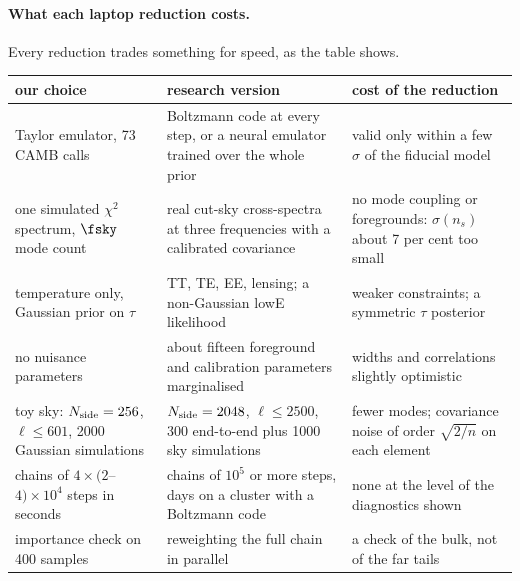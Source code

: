 \paragraph{What each laptop reduction costs.} Every reduction trades something for speed, as the table shows.
\begin{center}
\small
\renewcommand{\arraystretch}{1.15}
\begin{tabularx}{\linewidth}{@{}>{\raggedright\arraybackslash}p{3.3cm}>{\raggedright\arraybackslash}X>{\raggedright\arraybackslash}X@{}}
\toprule
our choice & research version & cost of the reduction\\\midrule
Taylor emulator, 73 CAMB calls & Boltzmann code at every step, or a neural emulator trained over the whole prior & valid only within a few $\sigma$ of the fiducial model\\
one simulated $\chi^2$ spectrum, $\fsky$ mode count & real cut-sky cross-spectra at three frequencies with a calibrated covariance & no mode coupling or foregrounds: $\sigma(n_s)$ about 7 per cent too small\\
temperature only, Gaussian prior on $\tau$ & TT, TE, EE, lensing; a non-Gaussian lowE likelihood & weaker constraints; a symmetric $\tau$ posterior\\
no nuisance parameters & about fifteen foreground and calibration parameters marginalised & widths and correlations slightly optimistic\\
toy sky: $N_{\rm side}=256$, $\ell\le601$, 2000 Gaussian simulations & $N_{\rm side}=2048$, $\ell\le2500$, 300 end-to-end plus 1000 sky simulations & fewer modes; covariance noise of order $\sqrt{2/n}$ on each element\\
chains of $4\times(2$--$4)\times10^4$ steps in seconds & chains of $10^5$ or more steps, days on a cluster with a Boltzmann code & none at the level of the diagnostics shown\\
importance check on 400 samples & reweighting the full chain in parallel & a check of the bulk, not of the far tails\\
\bottomrule
\end{tabularx}
\end{center}

